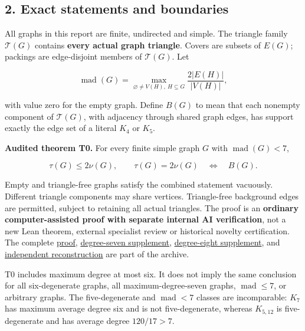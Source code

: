 \documentclass[11pt,a4paper]{article}
\begin{document}
\subsection{2. Exact statements and boundaries}\label{exact-statements-and-boundaries}

All graphs in this report are finite, undirected and simple. The triangle family \(\mathcal T(G)\) contains \textbf{every actual graph triangle}. Covers are subsets of \(E(G)\); packings are edge-disjoint members of \(\mathcal T(G)\). Let

\[\operatorname{mad}(G)=\max_{\varnothing\ne V(H),\ H\subseteq G}\frac{2|E(H)|}{|V(H)|},\]

with value zero for the empty graph. Define \(B(G)\) to mean that each nonempty component of \(\mathcal T(G)\), with adjacency through shared graph edges, has support exactly the edge set of a literal \(K_4\) or \(K_5\).

\textbf{Audited theorem T0.} For every finite simple graph \(G\) with \(\operatorname{mad}(G)<7\),

\[\tau(G)\le2\nu(G),\qquad
\tau(G)=2\nu(G)\quad\Longleftrightarrow\quad B(G).\]

Empty and triangle-free graphs satisfy the combined statement vacuously. Different triangle components may share vertices. Triangle-free background edges are permitted, subject to retaining all actual triangles. The proof is an \textbf{ordinary computer-assisted proof with separate internal AI verification}, not a new Lean theorem, external specialist review or historical novelty certification. The complete \href{https://github.com/pappa211/ai-math-experiments/blob/main/problems/TUZA-15/PROOFS_AND_OBSTRUCTIONS.md}{proof}, \href{https://github.com/pappa211/ai-math-experiments/blob/main/problems/TUZA-15/notes/SCOUT_B_RESULTS.md}{degree-seven supplement}, \href{https://github.com/pappa211/ai-math-experiments/blob/main/problems/TUZA-15/notes/SCOUT_B_DEGREE8.md}{degree-eight supplement}, and \href{https://github.com/pappa211/ai-math-experiments/blob/main/problems/TUZA-15/verification/INDEPENDENT_PROOF_AUDIT.md}{independent reconstruction} are part of the archive.

T0 includes maximum degree at most six. It does not imply the same conclusion for all six-degenerate graphs, all maximum-degree-seven graphs, \(\operatorname{mad}\le7\), or arbitrary graphs. The five-degenerate and \(\operatorname{mad}<7\) classes are incomparable: \(K_7\) has maximum average degree six and is not five-degenerate, whereas \(K_{5,12}\) is five-degenerate and has average degree \(120/17>7\).
\end{document}
